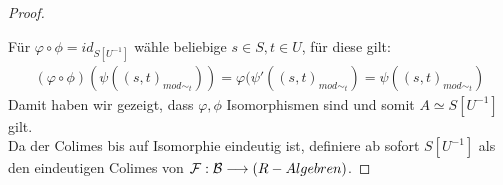 \documentclass[10pt,a4paper]{report}
\newcommand{\functionfront}[3]{\nolinebreak{#1:#2 \longrightarrow #3}}
\newcommand{\lok}[2]{#1 [#2^{-1}]}
\newcommand{\loke}[3]{(#1,#2)_{mod\sim_{#3}}}
\begin{document}
\begin{proof}
\begin{center}
\end{center}
Für $\varphi \circ \phi = id_{\lok{S}{U}}$ wähle beliebige $s \in S , t \in U$, für diese gilt:
\begin{gather*}
(\varphi \circ \phi)(\psi(\loke{s}{t}{t})) =
 \varphi (\psi'(\loke{s}{t}{t}) =
  \psi(\loke{s}{t}{t})
\end{gather*}
Damit haben wir gezeigt, dass $\varphi,\phi$ Isomorphismen sind und somit $A \simeq \lok{S}{U}$ gilt.\\
Da der Colimes bis auf Isomorphie eindeutig ist, definiere ab sofort $\lok{S}{U}$ als den eindeutigen Colimes von
 $\functionfront{\mathcal{F}}{\mathcal{B}}{(R-Algebren)}$.
 \end{proof}
\end{document}
